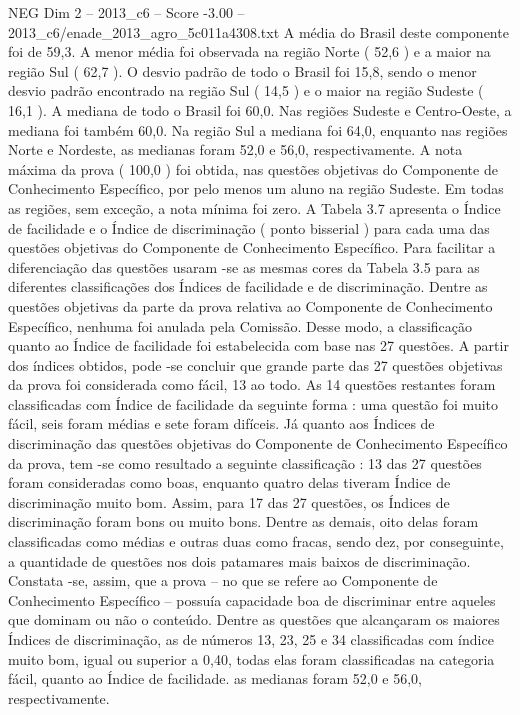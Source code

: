 \begin{textsample}{NEG Dim 2 – 2013\_c6 – Score -3.00 – 2013\_c6/enade\_2013\_agro\_5c011a4308.txt}
A média do Brasil deste componente foi de 59,3.
A menor média foi observada na região Norte ( 52,6 ) e a maior na região Sul ( 62,7 ).
O desvio padrão de todo o Brasil foi 15,8, sendo o menor desvio padrão encontrado na região Sul ( 14,5 ) e o maior na região Sudeste ( 16,1 ).
A mediana de todo o Brasil foi 60,0.
Nas regiões Sudeste e Centro-Oeste, a mediana foi também 60,0.
Na região Sul a mediana foi 64,0, enquanto nas regiões Norte e Nordeste, as medianas foram 52,0 e 56,0, respectivamente.
A nota máxima da prova ( 100,0 ) foi obtida, nas questões objetivas do Componente de Conhecimento Específico, por pelo menos um aluno na região Sudeste.
Em todas as regiões, sem exceção, a nota mínima foi zero.
A Tabela 3.7 apresenta o Índice de facilidade e o Índice de discriminação ( ponto bisserial ) para cada uma das questões objetivas do Componente de Conhecimento Específico.
Para facilitar a diferenciação das questões usaram -se as mesmas cores da Tabela 3.5 para as diferentes classificações dos Índices de facilidade e de discriminação.
Dentre as questões objetivas da parte da prova relativa ao Componente de Conhecimento Específico, nenhuma foi anulada pela Comissão.
Desse modo, a classificação quanto ao Índice de facilidade foi estabelecida com base nas 27 questões.
A partir dos índices obtidos, pode -se concluir que grande parte das 27 questões objetivas da prova foi considerada como fácil, 13 ao todo.
As 14 questões restantes foram classificadas com Índice de facilidade da seguinte forma : uma questão foi muito fácil, seis foram médias e sete foram difíceis.
Já quanto aos Índices de discriminação das questões objetivas do Componente de Conhecimento Específico da prova, tem -se como resultado a seguinte classificação : 13 das 27 questões foram consideradas como boas, enquanto quatro delas tiveram Índice de discriminação muito bom.
Assim, para 17 das 27 questões, os Índices de discriminação foram bons ou muito bons.
Dentre as demais, oito delas foram classificadas como médias e outras duas como fracas, sendo dez, por conseguinte, a quantidade de questões nos dois patamares mais baixos de discriminação.
Constata -se, assim, que a prova – no que se refere ao Componente de Conhecimento Específico – possuía capacidade boa de discriminar entre aqueles que dominam ou não o conteúdo.
Dentre as questões que alcançaram os maiores Índices de discriminação, as de números 13, 23, 25 e 34 classificadas com índice muito bom, igual ou superior a 0,40, todas elas foram classificadas na categoria fácil, quanto ao Índice de facilidade. as medianas foram 52,0 e 56,0, respectivamente.

\end{textsample}

